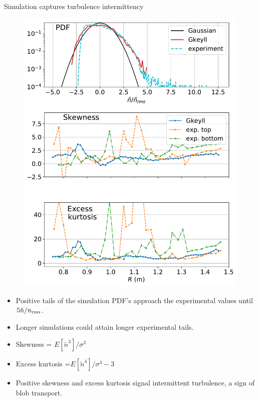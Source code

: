 \documentclass[12pt,table]{beamer}
\begin{document}
\begin{frame}{Simulation captures turbulence intermittency}
\begin{minipage}{.5\linewidth}
\begin{figure}
    \vspace{.5cm}
    \centering
    \includegraphics[width=\linewidth]{figs/pdf-skew-kurt-sw.pdf}
    \label{fig:my_label}
\end{figure}%
\end{minipage}%
\begin{minipage}{.5\linewidth}
\begin{itemize}
\footnotesize
\vspace{-.5cm}
    \item Positive tails of the simulation PDF's approach the experimental values until $5\tilde{n}/n_{\rm rms}$. 
    \item Longer simulations could attain longer experimental tails.
    \vspace{1.5cm}
    \item Skewness = $E[\tilde{n}^3]/\sigma^3$
    \item Excess kurtosis  =$E[\tilde{n}^4]/\sigma^4 - 3$
    \item Positive skewness and excess kurtosis signal intermittent turbulence, a sign of blob transport.
\end{itemize}
\end{minipage}%
\end{frame}
\end{document}
